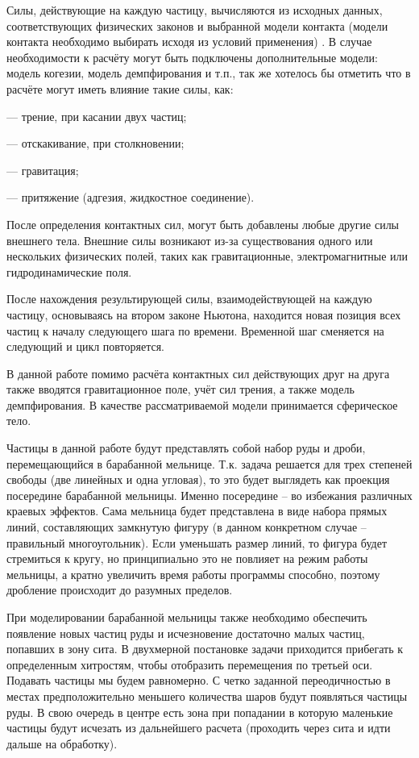 \documentclass[utf8x, 14pt, oneside, a4paper]{article}
\begin{document}
Силы, действующие на каждую частицу, вычисляются из исходных данных, соответствующих физических законов и выбранной модели контакта (модели контакта необходимо выбирать исходя из условий применения) \cite{some}. 
В случае необходимости к расчёту могут быть подключены дополнительные модели: модель когезии, модель демпфирования и т.п., так же хотелось бы отметить что в расчёте могут иметь влияние такие силы, как:

--- трение, при касании двух частиц;

--- отскакивание, при столкновении;

--- гравитация;

--- притяжение (адгезия, жидкостное соединение).

После определения контактных сил, могут быть добавлены любые другие силы внешнего тела. 
Внешние силы возникают из-за существования одного или нескольких физических полей, таких как гравитационные, электромагнитные или гидродинамические поля.

После нахождения результирующей силы, взаимодействующей на каждую частицу, основываясь на втором законе Ньютона, находится новая позиция всех частиц к началу следующего шага по времени.
Временной шаг сменяется на следующий и цикл повторяется.

В данной работе помимо расчёта контактных сил действующих друг на друга также вводятся гравитационное поле, учёт сил трения, а также модель демпфирования. 
В качестве рассматриваемой модели принимается сферическое тело.

Частицы в данной работе будут представлять собой набор руды и дроби, перемещающийся в барабанной мельнице.
Т.к. задача решается для трех степеней свободы (две линейных и одна угловая), то это будет выглядеть как проекция посередине барабанной мельницы. Именно посередине -- во избежания различных краевых эффектов. Сама мельница будет представлена в виде набора прямых линий, составляющих замкнутую фигуру (в данном конкретном случае -- правильный многоугольник). Если уменьшать размер линий, то фигура будет стремиться к кругу, но принципиально это не повлияет на режим работы мельницы, а кратно увеличить время работы программы способно, поэтому дробление происходит до разумных пределов.

При моделировании барабанной мельницы также необходимо обеспечить появление новых частиц руды и исчезновение достаточно малых частиц, попавших в зону сита.
В двухмерной постановке задачи приходится прибегать к определенным хитростям, чтобы отобразить перемещения по третьей оси.
Подавать частицы мы будем равномерно.
С четко заданной переодичностью в местах предположительно меньшего количества шаров будут появляться частицы руды.
В свою очередь в центре есть зона при попадании в которую маленькие частицы будут исчезать из дальнейшего расчета (проходить через сита и идти дальше на обработку).
\end{document}
